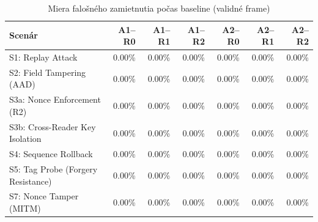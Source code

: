 \begin{table}[htbp]
\centering
\caption{Miera falošného zamietnutia počas baseline (validné frame)}
\label{tab:baseline}
\begin{tabular}{l r r r r r r}
\toprule
Scenár & A1--R0 & A1--R1 & A1--R2 & A2--R0 & A2--R1 & A2--R2 \\
\midrule
  S1: Replay Attack & 0.00\% & 0.00\% & 0.00\% & 0.00\% & 0.00\% & 0.00\% \\
  S2: Field Tampering (AAD) & 0.00\% & 0.00\% & 0.00\% & 0.00\% & 0.00\% & 0.00\% \\
  S3a: Nonce Enforcement (R2) & 0.00\% & 0.00\% & 0.00\% & 0.00\% & 0.00\% & 0.00\% \\
  S3b: Cross-Reader Key Isolation & 0.00\% & 0.00\% & 0.00\% & 0.00\% & 0.00\% & 0.00\% \\
  S4: Sequence Rollback & 0.00\% & 0.00\% & 0.00\% & 0.00\% & 0.00\% & 0.00\% \\
  S5: Tag Probe (Forgery Resistance) & 0.00\% & 0.00\% & 0.00\% & 0.00\% & 0.00\% & 0.00\% \\
  S7: Nonce Tamper (MITM) & 0.00\% & 0.00\% & 0.00\% & 0.00\% & 0.00\% & 0.00\% \\
\bottomrule
\end{tabular}
\end{table}